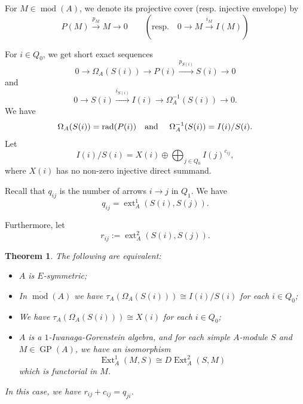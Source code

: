 \documentclass[12pt,reqno]{amsart}
\newtheorem{Thm}{Theorem}[section]
\theoremstyle{definition}
\newcommand{\md}{\operatorname{mod}}
\newcommand{\rad}{\operatorname{rad}}
\newcommand{\GP}{\operatorname{GP}}
\newcommand{\Ext}{\operatorname{Ext}}
\newcommand{\ext}{\operatorname{ext}}
\begin{document}

For $M \in \md(A)$, we denote its projective cover (resp. injective envelope)
by
$$
P(M) \xrightarrow{p_M} M \to 0
\qquad
(\text{resp.} \quad 0 \to M \xrightarrow{i_M} I(M))
$$

For $i \in Q_0$, we get short exact sequences
\begin{equation}\label{eq:1a}
0 \to \Omega_A(S(i)) \to P(i) \xrightarrow{p_{S(i)}} S(i) \to 0
\end{equation}
and 
\begin{equation}\label{eq:1b}
0 \to S(i) \xrightarrow{i_{S(i)}} I(i) \to \Omega_A^{-1}(S(i))
\to 0.
\end{equation}
We have
$$
\Omega_A(S(i)) = \rad(P(i))
\text{\quad and \quad}
\Omega_A^{-1}(S(i)) = I(i)/S(i).
$$
Let 
$$
I(i)/S(i) = X(i) \oplus \bigoplus_{j \in Q_0} I(j)^{c_{ij}},
$$
where $X(i)$ has no non-zero injective direct summand.




Recall that $q_{ij}$ is the number of arrows $i \to j$ in $Q_1$.
We have
$$
q_{ij} = \ext_A^1(S(i),S(j)).
$$

Furthermore, let
$$
r_{ij} := \ext_A^2(S(i),S(j)).
$$


\begin{Thm}\label{thm:mainpart1}
The following are equivalent:
\begin{itemize}\itemsep2mm

\item[(i)]
$A$ is $E$-symmetric;

\item[(ii)]
In $\overline{\md}(A)$ we have
$\tau_A(\Omega_A(S(i))) \cong I(i)/S(i)$ for each $i \in Q_0$;

\item[(iii)]
We have $\tau_A(\Omega_A(S(i))) \cong X(i)$ for each $i \in Q_0$;

\item[(iv)]
$A$ is a $1$-Iwanaga-Gorenstein algebra, and for each simple $A$-module $S$ and $M \in \GP(A)$, we have an isomorphism
$$
\Ext_A^1(M,S) \cong D\!\Ext_A^2(S,M)
$$
which is functorial in $M$.

\end{itemize}
In this case, we have $r_{ij} + c_{ij} = q_{ji}$.
\end{Thm}
\end{document}
